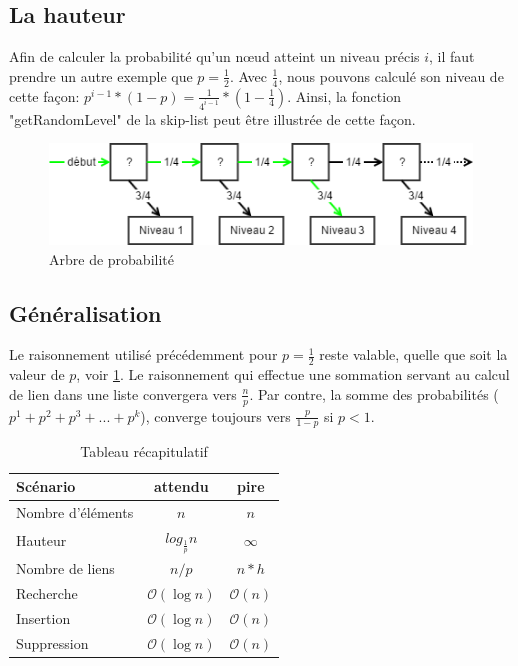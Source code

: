 \documentclass[hidelinks,a4paper, 12pt]{article}
\begin{document}
	
	\subsection{La hauteur}
	 Afin de calculer la probabilité qu'un nœud atteint un niveau précis $i$, il faut prendre un autre exemple que $p=\frac{1}{2}$. Avec $\frac{1}{4}$, nous pouvons calculé son niveau de cette façon: ${p^{i-1}*(1-p)} = \frac{1}{{4}^{i-1}}*(1-\frac{1}{4}) $. Ainsi, la fonction "getRandomLevel" de la skip-list peut être illustrée de cette façon.
	 
	 \begin{figure}[h]
	 	\includegraphics[width=\textwidth]{img/probatree}
	 	\caption{Arbre de probabilité}
	 	\label{ProbaTree}
	 \end{figure}
	 
	 \subsection{Généralisation}
	 Le raisonnement utilisé précédemment pour $p=\frac{1}{2}$ reste valable, quelle que soit la valeur de $p$, voir \cref{recap}. Le raisonnement qui effectue une sommation servant au calcul de lien dans une liste convergera vers $\frac{n}{p}$. Par contre, la somme des probabilités ($p^1 + p^2 + p^3 + ... + p^k$), converge toujours vers $\frac{p}{1-p}$ si $p<1$. 
	 
	 
	 \begin{table}[h]
	 \begin{tabular}{|l|c|c|}
	 	\hline
	 	Scénario & attendu & pire \\
	 	\hline
	 	Nombre d'éléments & $n$ & $n$ \\ 
	 	\hline
	 	Hauteur & $log_{\frac{1}{p}} n$ & $\infty$\footnotemark  \\ 
	 	\hline
	 	Nombre de liens & $n/p$ & $n*h$ \\ 
	 	\hline
	 	Recherche & $\mathcal{O}(\log n)$ & $\mathcal{O}(n)$ \\ 
	 	\hline
	 	Insertion & $\mathcal{O}(\log n)$ & $\mathcal{O}(n)$ \\
	 	\hline
	 	Suppression & $\mathcal{O}(\log n)$ & $\mathcal{O}(n)$\\
	 	\hline
	 \end{tabular}
	 \caption{Tableau récapitulatif}
	 \label{recap}
	 
	 \end{table}
	 
\end{document}
